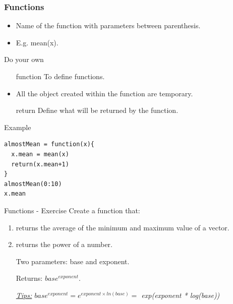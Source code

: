 \documentclass[10pt]{beamer}
\newenvironment{xframe}[2][]
  {\begin{frame}[fragile,environment=xframe,#1]
  \frametitle{#2}}
  {\end{frame}}
\begin{document}
\begin{xframe}{Functions}
  \begin{block}{}
    \begin{itemize}
    \item Name of the function with parameters between parenthesis.
    \item E.g. {\sf mean(x)}.
    \end{itemize}
  \end{block}
  \begin{block}{Do your own}
    \begin{itemize}
      \item[function] To define functions.
      \item All the object created within the function are temporary.
      \item[return] Define what will be returned by the function. 
    \end{itemize}
  \end{block}
  \begin{exampleblock}{Example}
\begin{verbatim}
almostMean = function(x){
  x.mean = mean(x)
  return(x.mean+1)
}
almostMean(0:10)
x.mean
\end{verbatim}
  \end{exampleblock}
\end{xframe}


\begin{frame}{Functions - Exercise}
  Create a function that: 
  \begin{enumerate}
  \item returns the average of the minimum and maximum value of a {\sf vector}.
  \item returns the power of a number. 
    
    Two parameters: {\sf base} and {\sf exponent}. 
    
    Returns: $base^{exponent}$.
    \medskip
    
    {\tiny\it \uline{Tips:}   $base^{exponent} = e^{exponent \times ln(base)} = $ {\sf exp(exponent * log(base))} }
  \end{enumerate}
\end{frame}
\end{document}
